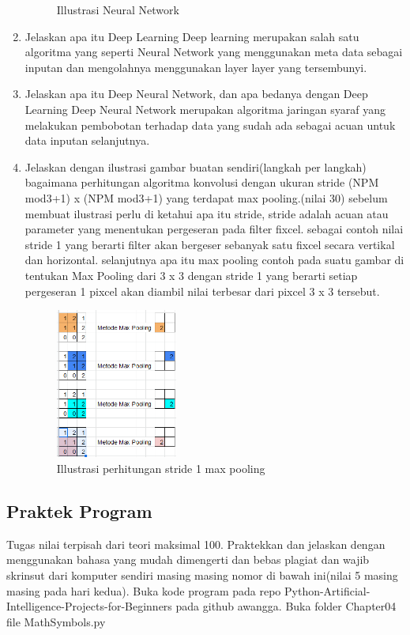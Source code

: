 \begin{enumerate}
\begin{figure}[H]
    \centering
    \caption{Illustrasi Neural Network}
\end{figure}
\item
Jelaskan apa itu Deep Learning
Deep learning merupakan salah satu algoritma yang seperti Neural Network yang menggunakan meta data sebagai inputan dan mengolahnya menggunakan layer layer yang tersembunyi.
\item
Jelaskan apa itu Deep Neural Network, dan apa bedanya dengan Deep Learning
Deep Neural Network merupakan algoritma jaringan syaraf yang melakukan pembobotan terhadap data yang sudah ada sebagai acuan untuk data inputan selanjutnya. 
\item
Jelaskan dengan ilustrasi gambar buatan sendiri(langkah per langkah) bagaimana perhitungan algoritma konvolusi dengan ukuran stride (NPM mod3+1) x (NPM mod3+1) yang terdapat max pooling.(nilai 30)
sebelum membuat ilustrasi perlu di ketahui apa itu stride, stride adalah acuan atau parameter yang menentukan pergeseran pada ﬁlter ﬁxcel. sebagai contoh nilai stride 1 yang berarti ﬁlter akan bergeser sebanyak satu ﬁxcel secara vertikal dan horizontal. selanjutnya apa itu max pooling contoh pada suatu gambar di tentukan Max Pooling dari 3 x 3 dengan stride 1 yang berarti setiap pergeseran 1 pixcel akan diambil nilai terbesar dari pixcel 3 x 3 tersebut.
\begin{figure}[H]
    \includegraphics[width=4cm]{figures/1174003/7/teori_10.png}
    \centering
    \caption{Illustrasi perhitungan stride 1 max pooling}
\end{figure}
\end{enumerate}



\subsection{Praktek Program}
Tugas nilai terpisah dari teori maksimal 100. Praktekkan dan jelaskan dengan menggunakan bahasa yang mudah dimengerti dan bebas plagiat dan wajib skrinsut dari komputer sendiri masing masing nomor di bawah ini(nilai 5 masing masing pada hari kedua). Buka kode program pada repo Python-Artificial-Intelligence-Projects-for-Beginners pada github awangga. Buka folder Chapter04 file MathSymbols.py

